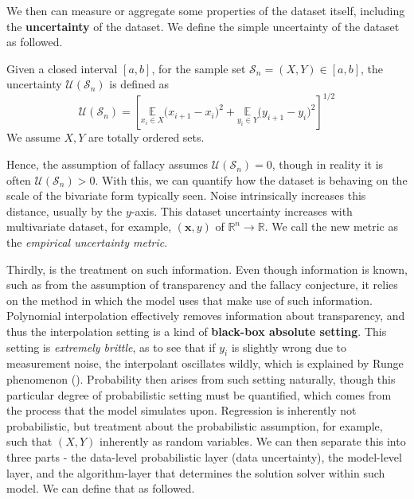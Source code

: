 \documentclass[10pt]{article} %
\begin{document}
We then can measure or aggregate some properties of the dataset itself, including the \textbf{uncertainty} of the dataset. We define the simple uncertainty of the dataset as followed. 

\begin{definition}
    Given a closed interval $[a,b]$, for the sample set $\mathcal{S}_{n}=(X,Y)\in [a,b]$, the uncertainty $\mathcal{U}(\mathcal{S}_{n})$ is defined as 
    \begin{equation}
        \mathcal{U}(\mathcal{S}_{n}) = \left[ \underset{x_{i}\in X}{\mathbb{E}}\Big( x_{i+1} - x_{i} \Big)^{2} + \underset{y_{i}\in Y}{\mathbb{E}} \Big( y_{i+1}- y_{i} \Big)^{2} \right]^{1/2}
    \end{equation}
    We assume $X,Y$ are totally ordered sets. 
\end{definition}
Hence, the assumption of fallacy assumes $\mathcal{U}(\mathcal{S}_{n})=0$, though in reality it is often $\mathcal{U}(\mathcal{S}_{n})>0$. With this, we can quantify how the dataset is behaving on the scale of the bivariate form typically seen. Noise intrinsically increases this distance, usually by the $y$-axis. This dataset uncertainty increases with multivariate dataset, for example, $(\mathbf{x},y)$ of $\mathbb{R}^{n}\to\mathbb{R}$. We call the new metric as the \textit{empirical uncertainty metric}.

Thirdly, is the treatment on such information. Even though information is known, such as from the assumption of transparency and the fallacy conjecture, it relies on the method in which the model uses that make use of such information. Polynomial interpolation effectively removes information about transparency, and thus the interpolation setting is a kind of \textbf{black-box absolute setting}. This setting is \textit{extremely brittle}, as to see that if $y_{i}$ is slightly wrong due to measurement noise, the interpolant oscillates wildly, which is explained by Runge phenomenon (\cite{Runge1901,CorlessSevyeri2018,AMC2009RungeDivergence}). Probability then arises from such setting naturally, though this particular degree of probabilistic setting must be quantified, which comes from the process that the model simulates upon. Regression is inherently not probabilistic, but treatment about the probabilistic assumption, for example, such that $(X,Y)$ inherently as random variables. We can then separate this into three parts - the data-level probabilistic layer (data uncertainty), the model-level layer, and the algorithm-layer that determines the solution solver within such model. We can define that as followed. 
\end{document}
